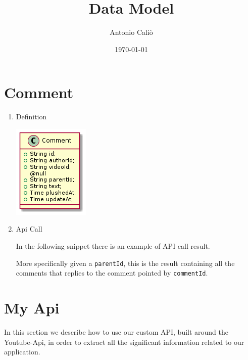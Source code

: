 \documentclass[11pt]{article}
\author{Antonio Caliò}
\date{\today}
\title{Data Model}
\begin{document}
\maketitle

\section{Comment}
\label{sec:org25e3f20}
\begin{enumerate}
\item Definition
\label{sec:org10d22c9}
\begin{center}
\includegraphics[width=.9\linewidth]{comment.png}
\end{center}

\item Api Call
\label{sec:orgab9711d}

In the following snippet there is an example of API call result.

More specifically given a \texttt{parentId}, this is the result containing all the 
comments that replies to the comment pointed by \texttt{commentId}.
\end{enumerate}
\section{My Api}
\label{sec:org0b7a04e}
In this section we describe how to use our custom API, built around the Youtube-Api, in order to
extract all the significant information related to our application.
\end{document}
